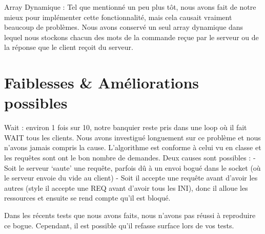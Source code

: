 \documentclass[11pt]{article}
\begin{document}
Array Dynamique : Tel que mentionné un peu plus tôt, nous avons fait de notre mieux pour implémenter cette fonctionnalité, mais cela causait vraiment beaucoup de problèmes. Nous avons conservé un seul array dynamique dans lequel nous stockons chacun des mots de la commande reçue par le serveur ou de la réponse que le client reçoit du serveur.


\section{Faiblesses & Améliorations possibles}
Wait : environ 1 fois sur 10, notre banquier reste pris dans une loop où il fait WAIT tous les clients. Nous avons investigué longuement sur ce problème et nous n’avons jamais compris la cause. L’algorithme est conforme à celui vu en classe et les requêtes sont ont le bon nombre de demandes. Deux causes sont possibles :
- Soit le serveur ‘saute’ une requête, parfois dû à un envoi bogué dans le socket (où le serveur envoie du vide au client)
- Soit il accepte une requête avant d’avoir les autres (style il accepte une REQ avant d’avoir tous les INI), donc il alloue les ressources et ensuite se rend compte qu’il est bloqué.

Dans les récents tests que nous avons faits, nous n’avons pas réussi à reproduire ce bogue. Cependant, il est possible qu’il refasse surface lors de vos tests.




\end{document}
